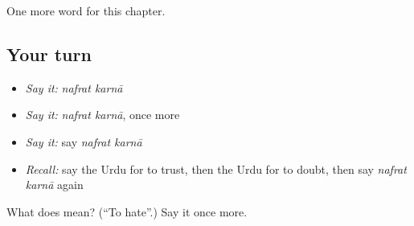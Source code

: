 \begin{grammarlens}[title={What you've built}]
One more word for this chapter.
\end{grammarlens}

\subsection*{Your turn}
\begin{itemize}
\raggedright
  \item \emph{Say it:} \emph{nafrat karnā}
  \item \emph{Say it:} \emph{nafrat karnā}, once more
  \item \emph{Say it:} say \emph{nafrat karnā}
  \item \emph{Recall:} say the Urdu for to trust, then the Urdu for to doubt, then say \emph{nafrat karnā} again
\end{itemize}

\begin{tcolorbox}[breakable,colback=teal!4,colframe=teal!35!black,title={Before you move on}]
What does   mean? (\textquotedblleft{}To hate\textquotedblright{}.) Say it once more.
\end{tcolorbox}
